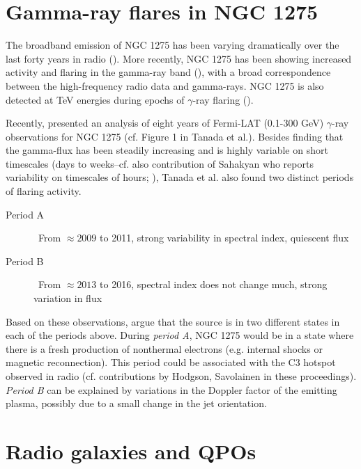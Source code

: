 \documentclass{iau}
\begin{document}
\section{Gamma-ray flares in NGC 1275}

The broadband emission of NGC 1275 has been varying dramatically over the last forty years in radio (\cite[Dutson et al. 2014]{Dutson2014}). More recently, NGC 1275 has been showing increased activity and flaring in the gamma-ray band (\cite[Tanada et al. 2018]{Tanada2018}), with a broad correspondence between the high-frequency radio data and gamma-rays. NGC 1275 is also detected at TeV energies during epochs of $\gamma$-ray flaring (\cite[Aleksic et al. 2012]{Aleksic2012}).

Recently, \cite{Tanada2018} presented an analysis of eight years of Fermi-LAT (0.1-300 GeV) $\gamma$-ray observations for NGC 1275 (cf. Figure 1 in Tanada et al.). Besides finding that  the gamma-flux has been steadily increasing and is highly variable on short timescales (days to weeks--cf. also contribution of Sahakyan who reports variability on timescales of hours; \cite[Baghmanyan et al. 2017]{Baghmanyan2017}), Tanada et al. also found two distinct periods of flaring activity.
\begin{description}
	\item[Period A] \ From $\approx 2009$ to 2011, strong variability in spectral index, quiescent flux
	\item[Period B] \ From $\approx 2013$ to 2016, spectral index does not change much, strong variation in flux
\end{description}
Based on these observations, \cite{Tanada2018} argue that the source is in two different states in each of the periods above. During \textit{period A}, NGC 1275 would be in a state where there is a fresh production of nonthermal electrons (e.g.  internal shocks or magnetic reconnection). This period could be associated with the C3 hotspot observed in radio (cf. contributions by Hodgson, Savolainen in these proceedings). \textit{Period B} can be explained by variations in the Doppler factor of the emitting plasma, possibly due to a small change in the jet orientation.








\section{Radio galaxies and QPOs}
\end{document}
